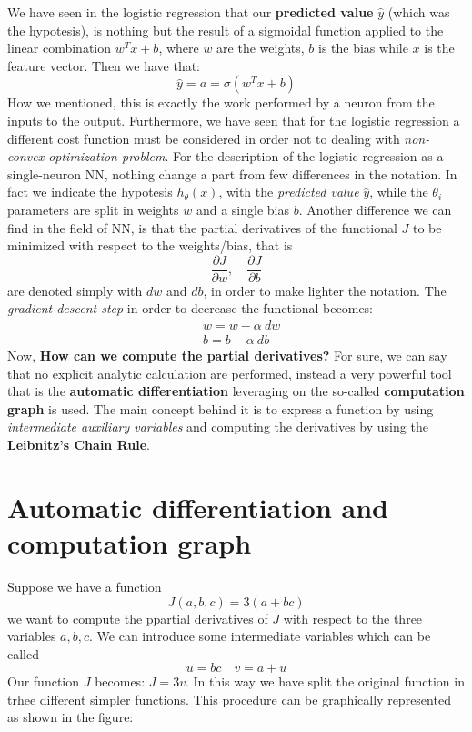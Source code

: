 \noindent
We have seen in the logistic regression that our \textbf{predicted value} $\hat{y}$ (which was the hypotesis), is nothing but the result of a sigmoidal function applied to the linear combination $w^T{x}+b$, where $w$ are the weights, $b$ is the bias while $x$ is the feature vector. Then we have that: 
\begin{equation}
    \hat{y}=a=\sigma(w^T{x}+b)
\end{equation}
How we mentioned, this is exactly the work performed by a neuron from the inputs to the output. Furthermore, we have seen that for the logistic regression a different cost function must be considered in order not to dealing with \textit{non-convex optimization problem}. For the description of the logistic regression as a single-neuron NN, nothing change a part from few differences in the notation. In fact we indicate the hypotesis $h_\theta(x)$, with the \textit{predicted value} $\hat{y}$, while the $\theta_i$ parameters are split in weights $w$ and a single bias $b$. Another difference we can find in the field of NN, is that the partial derivatives of the functional $J$ to be minimized with respect to the weights/bias, that is 
\begin{equation}
    \frac{\partial{J}}{\partial{w}}, \quad 
    \frac{\partial{J}}{\partial{b}}
\end{equation}
are denoted simply with $dw$ and $db$, in order to make lighter the notation. The \textit{gradient descent step} in order to decrease the functional becomes:
\begin{align*}
    &w = w - \alpha\ {dw}\\
    &b = b - \alpha\ {db}
\end{align*}
Now, \textbf{How can we compute the partial derivatives?} For sure, we can say that no explicit analytic calculation are performed, instead a very powerful tool that is the \textbf{automatic differentiation} leveraging on the so-called \textbf{computation graph} is used. The main concept behind it is to express a function by using \textit{intermediate auxiliary variables} and computing the derivatives by using the \textbf{Leibnitz's Chain Rule}.

\section{Automatic differentiation and computation graph}
Suppose we have a function
\begin{equation}\label{eq:exJ}
    J(a,b,c)=3(a+bc)
\end{equation}
we want to compute the ppartial derivatives of $J$ with respect to the three variables $a,b,c$. We can introduce some intermediate variables which can be called
\begin{equation*}
    u=bc \quad  v=a+u
\end{equation*}
Our function $J$ becomes: $J=3v$. In this way we have split the original function in trhee different simpler functions. This procedure can be graphically represented as shown in the figure:


